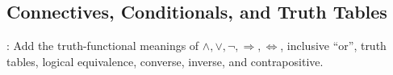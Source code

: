 \subsection{Connectives, Conditionals, and Truth Tables}

: Add the truth-functional meanings of $\land,\lor,\neg,\Rightarrow,\Longleftrightarrow$, inclusive ``or'', truth tables, logical equivalence, converse, inverse, and contrapositive.
